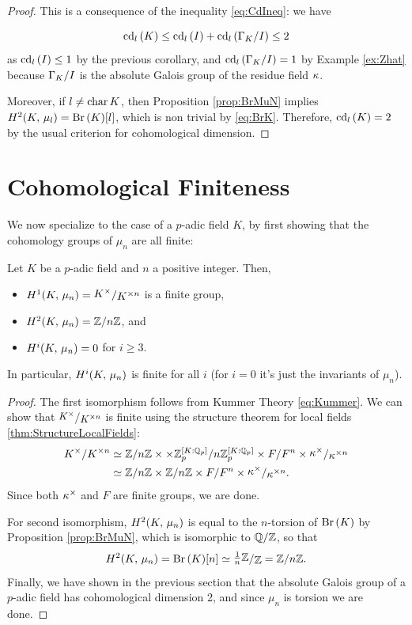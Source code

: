 \documentclass[a4paper, oneside]{memoir}
\begin{document}
\begin{proof}
	This is a consequence of the inequality \ref{eq:CdIneq}: we have

	\[
		\operatorname{cd}_l{(K)}\leq \operatorname{cd}_l{(I)}+\operatorname{cd}_l{(\Gamma_K / I)} \leq 2
	\]
	as $\operatorname{cd}_l{(I)}\leq 1$ by the previous corollary, and $\operatorname{cd}_l{(\Gamma_K / I)} = 1$ by Example \ref{ex:Zhat} because $\Gamma_K / I$ is the absolute Galois group of the residue
	field $\kappa$.

	Moreover, if $l\neq \operatorname{char}{K}$, then Proposition \ref{prop:BrMuN} implies $H^{2}( K, \, \mu_l )=\operatorname{Br}{(K)}[l]$, which is non trivial by \eqref{eq:BrK}. Therefore, $\operatorname{cd}_l{(K)}=2$ by the usual criterion for cohomological dimension.
\end{proof}

\section{Cohomological Finiteness}

We now specialize to the case of a $p$-adic field $K$, by first showing that the cohomology groups of $\mu_n$ are all finite:

\begin{theorem}\label{thm:CohomMuN}
	Let $K$ be a $p$-adic field and $n$ a positive integer.
	Then,
	\begin{itemize}
		\item $\H{1}{\K}{\mu_n} = \ssfrac{\K^\times}{\K^{\times n}}$ is a finite group,
		\item $H^{2}( K, \, \mu_n ) = \mathbb{Z}/n\mathbb{Z}$, and
		\item $H^{i}( K, \, \mu_n ) = 0$ for $i\geq 3$.
	\end{itemize}
	In particular, $H^{i}( K, \, \mu_n )$ is finite for all $i$ (for $i=0$ it's just the invariants of $\mu_n$).
\end{theorem}
\begin{proof}
	The first isomorphism follows from Kummer Theory \eqref{eq:Kummer}. We can show that $\sfrac{\K^\times}{\K^{\times n}}$ is finite using the structure theorem for local fields \ref{thm:StructureLocalFields}:
	\begin{align*}
		\K^\times/\K^{\times n} & \simeq \Zn \times  \times \Zp^{[\K:\Qp]}/n \Zp^{[\K:\Qp]} \times F/F^n \times  \ssfrac{\k^\times}{\k^{\times n}} \\
		                        & \simeq \Zn \times  \Zn \times F/F^n  \times \ssfrac{\k^\times}{\k^{\times n}}.
	\end{align*}
	Since both $\kappa^\times$ and $F$ are finite groups, we are done.

	For second isomorphism, $H^{2}( K, \, \mu_n )$ is equal to the $n$-torsion of $\operatorname{Br}{(K)}$ by Proposition \ref{prop:BrMuN}, which is isomorphic to $\mathbb{Q}/\mathbb{Z}$, so that
	\[
		\H{2}{\K}{\mu_n} = \Br{\K}[n] \simeq \ssfrac{\frac{1}{n}\Z}{\Z} = \Z/n\Z.
	\]
	Finally, we have shown in the previous section that the absolute Galois group of a $p$-adic field has cohomological dimension 2, and since $\mu_n$ is torsion we are done.
\end{proof}
\end{document}
